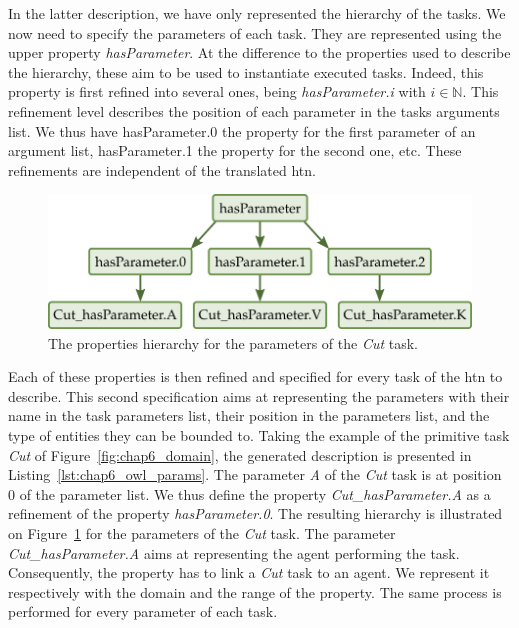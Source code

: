 In the latter description, we have only represented the hierarchy of the tasks. We now need to specify the parameters of each task. They are represented using the upper property \textit{hasParameter}. At the difference to the properties used to describe the hierarchy, these aim to be used to instantiate executed tasks. Indeed, this property is first refined into several ones, being \textit{hasParameter.i} with $i \in \mathbb{N}$. This refinement level describes the position of each parameter in the tasks arguments list. We thus have hasParameter.0 the property for the first parameter of an argument list, hasParameter.1 the property for the second one, etc. These refinements are independent of the translated \acrshort{htn}.

\begin{figure}[h!]
\centering
\includegraphics[scale=0.4]{figures/chapter6/rbox_params.png}
\caption{\label{fig:chap6_rbox_params} The properties hierarchy for the parameters of the \textit{Cut} task.}
\end{figure}

Each of these properties is then refined and specified for every task of the \acrshort{htn} to describe. This second specification aims at representing the parameters with their name in the task parameters list, their position in the parameters list, and the type of entities they can be bounded to. Taking the example of the primitive task \textit{Cut} of Figure~\ref{fig:chap6_domain}, the generated description is presented in Listing~\ref{lst:chap6_owl_params}. The parameter \textit{A} of the \textit{Cut} task is at position 0 of the parameter list. We thus define the property \textit{Cut\_hasParameter.A} as a refinement of the property \textit{hasParameter.0}. The resulting hierarchy is illustrated on Figure~\ref{fig:chap6_rbox_params} for the parameters of the \textit{Cut} task. The parameter \textit{Cut\_hasParameter.A} aims at representing the agent performing the task. Consequently, the property has to link a \textit{Cut} task to an agent. We represent it respectively with the domain and the range of the property. The same process is performed for every parameter of each task.

